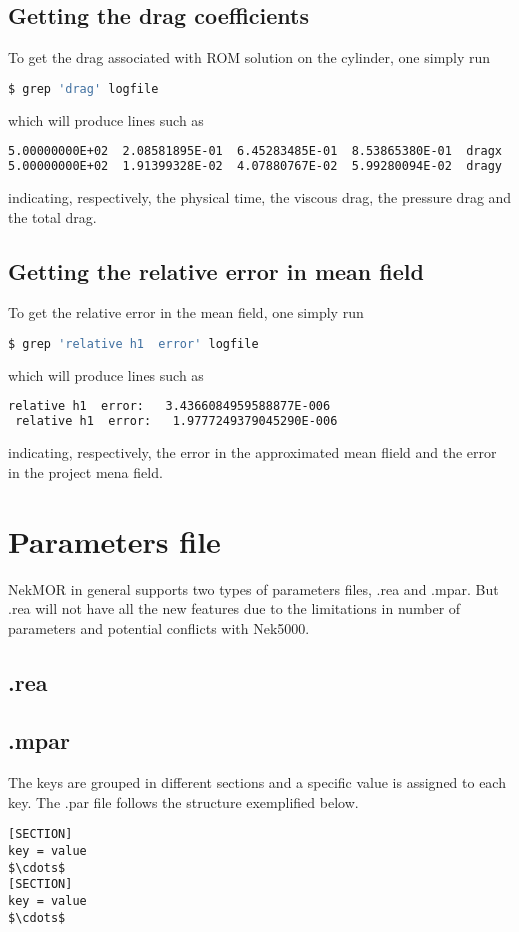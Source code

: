 \subsection{Getting the drag coefficients}
To get the drag associated with ROM solution on the cylinder, one simply run
\begin{lstlisting}[language=bash] 
$ grep 'drag' logfile
\end{lstlisting}
which will produce lines such as
\begin{lstlisting}[language=bash] 
5.00000000E+02  2.08581895E-01  6.45283485E-01  8.53865380E-01  dragx
5.00000000E+02  1.91399328E-02  4.07880767E-02  5.99280094E-02  dragy
\end{lstlisting}
indicating, respectively, the physical time, the viscous drag, the pressure
drag and the total drag.

\subsection{Getting the relative error in mean field}
To get the relative error in the mean field, one simply run
\begin{lstlisting}[language=bash] 
$ grep 'relative h1  error' logfile
\end{lstlisting}
which will produce lines such as
\begin{lstlisting}[language=bash] 
 relative h1  error:   3.4366084959588877E-006
 relative h1  error:   1.9777249379045290E-006
\end{lstlisting}
indicating, respectively, the error in the approximated mean flield and the
error in the project mena field.

\section{Parameters file} NekMOR in general supports two types of parameters
files, .rea and .mpar. But .rea will not have all the new features due to the
limitations in number of parameters and potential conflicts with Nek5000.
\subsection{.rea}
\subsection{.mpar} The keys are grouped in different sections
and a specific value is assigned to each key. The .par file follows the
structure exemplified below.  
\begin{lstlisting}[mathescape] 
[SECTION]
key = value
$\cdots$
[SECTION]
key = value
$\cdots$ 
\end{lstlisting}

